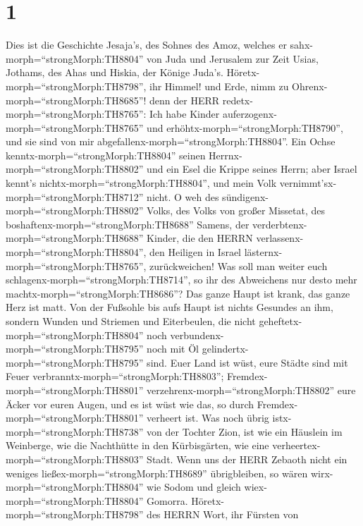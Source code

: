 \hypertarget{section}{%
\section{1}\label{section}}

 Dies ist die Geschichte Jesaja's, des Sohnes des Amoz,
welches er sahx-morph=``strongMorph:TH8804'' von Juda und Jerusalem zur
Zeit Usias, Jothams, des Ahas und Hiskia, der Könige Juda's.
 Höretx-morph=``strongMorph:TH8798'', ihr Himmel! und Erde,
nimm zu Ohrenx-morph=``strongMorph:TH8685''! denn der HERR
redetx-morph=``strongMorph:TH8765'': Ich habe Kinder
auferzogenx-morph=``strongMorph:TH8765'' und
erhöhtx-morph=``strongMorph:TH8790'', und sie sind von mir
abgefallenx-morph=``strongMorph:TH8804''.  Ein Ochse
kenntx-morph=``strongMorph:TH8804'' seinen
Herrnx-morph=``strongMorph:TH8802'' und ein Esel die Krippe seines
Herrn; aber Israel kennt's nichtx-morph=``strongMorph:TH8804'', und mein
Volk vernimmt'sx-morph=``strongMorph:TH8712'' nicht.  O weh
des sündigenx-morph=``strongMorph:TH8802'' Volks, des Volks von großer
Missetat, des boshaftenx-morph=``strongMorph:TH8688'' Samens, der
verderbtenx-morph=``strongMorph:TH8688'' Kinder, die den HERRN
verlassenx-morph=``strongMorph:TH8804'', den Heiligen in Israel
lästernx-morph=``strongMorph:TH8765'', zurückweichen!  Was
soll man weiter euch schlagenx-morph=``strongMorph:TH8714'', so ihr des
Abweichens nur desto mehr machtx-morph=``strongMorph:TH8686''? Das ganze
Haupt ist krank, das ganze Herz ist matt.  Von der Fußsohle
bis aufs Haupt ist nichts Gesundes an ihm, sondern Wunden und Striemen
und Eiterbeulen, die nicht geheftetx-morph=``strongMorph:TH8804'' noch
verbundenx-morph=``strongMorph:TH8795'' noch mit Öl
gelindertx-morph=``strongMorph:TH8795'' sind.  Euer Land ist
wüst, eure Städte sind mit Feuer
verbranntx-morph=``strongMorph:TH8803'';
Fremdex-morph=``strongMorph:TH8801''
verzehrenx-morph=``strongMorph:TH8802'' eure Äcker vor euren Augen, und
es ist wüst wie das, so durch Fremdex-morph=``strongMorph:TH8801''
verheert ist.  Was noch übrig
istx-morph=``strongMorph:TH8738'' von der Tochter Zion, ist wie ein
Häuslein im Weinberge, wie die Nachthütte in den Kürbisgärten, wie eine
verheertex-morph=``strongMorph:TH8803'' Stadt.  Wenn uns der
HERR Zebaoth nicht ein weniges ließex-morph=``strongMorph:TH8689''
übrigbleiben, so wären wirx-morph=``strongMorph:TH8804'' wie Sodom und
gleich wiex-morph=``strongMorph:TH8804'' Gomorra. 
Höretx-morph=``strongMorph:TH8798'' des HERRN Wort, ihr Fürsten von
